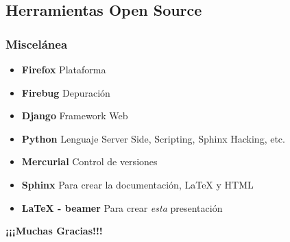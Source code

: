 \documentclass{beamer}
\begin{document}
\subsection{Herramientas Open Source}
\begin{frame}
    \frametitle{Miscelánea}
    \begin{itemize}
        \item {\bf Firefox} Plataforma
        \item {\bf Firebug} Depuración
        \item {\bf Django} Framework Web
        \item {\bf Python} Lenguaje Server Side, Scripting, Sphinx Hacking, etc.
        \item {\bf Mercurial} Control de versiones
        \item {\bf Sphinx} Para crear la documentación, \LaTeX{} y HTML
        \item {\bf \LaTeX{} - beamer} Para crear {\it esta} presentación
    \end{itemize}
\end{frame}

\begin{frame}
    \vfill
    \begin{center}
        {\Huge\bf ¡¡¡Muchas Gracias!!!}
    \end{center}
        
    
    \vfill
\end{frame}
\end{document}

